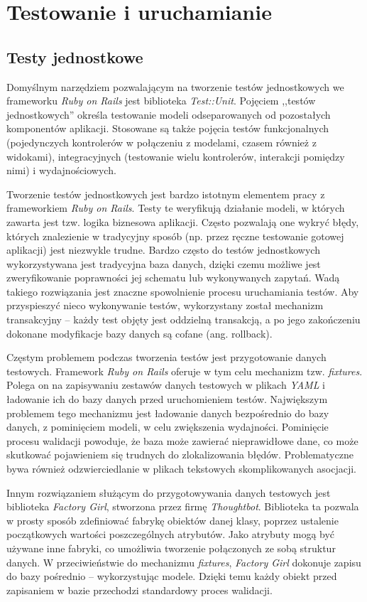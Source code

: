 \documentclass[a4paper,12pt]{article}
\begin{document}
\clearpage

\section{Testowanie i uruchamianie}

\subsection{Testy jednostkowe}
Domyślnym narzędziem pozwalającym na tworzenie testów jednostkowych we
frameworku \emph{Ruby on Rails} jest biblioteka
\emph{Test::Unit}. Pojęciem ,,testów jednostkowych'' określa
testowanie modeli odseparowanych od pozostałych komponentów
aplikacji. Stosowane są także pojęcia testów funkcjonalnych
(pojedynczych kontrolerów w połączeniu z modelami, czasem również z
widokami), integracyjnych (testowanie wielu kontrolerów, interakcji
pomiędzy nimi) i wydajnościowych.

Tworzenie testów jednostkowych jest bardzo istotnym elementem pracy z
frameworkiem \emph{Ruby on Rails}. Testy te weryfikują działanie
modeli, w których zawarta jest tzw. logika biznesowa aplikacji. Często
pozwalają one wykryć błędy, których znalezienie w tradycyjny sposób
(np. przez ręczne testowanie gotowej aplikacji) jest niezwykle
trudne. Bardzo często do testów jednostkowych wykorzystywana jest
tradycyjna baza danych, dzięki czemu możliwe jest zweryfikowanie
poprawności jej schematu lub wykonywanych zapytań. Wadą takiego
rozwiązania jest znaczne spowolnienie procesu uruchamiania testów. Aby
przyspieszyć nieco wykonywanie testów, wykorzystany został mechanizm
transakcyjny -- każdy test objęty jest oddzielną transakcją, a po jego
zakończeniu dokonane modyfikacje bazy danych są cofane
(ang. rollback).

Częstym problemem podczas tworzenia testów jest przygotowanie danych
testowych. Framework \emph{Ruby on Rails} oferuje w tym celu mechanizm
tzw. \emph{fixtures}. Polega on na zapisywaniu zestawów danych
testowych w plikach \emph{YAML} i ładowanie ich do bazy danych przed
uruchomieniem testów. Największym problemem tego mechanizmu jest
ładowanie danych bezpośrednio do bazy danych, z pominięciem modeli, w
celu zwiększenia wydajności. Pominięcie procesu walidacji powoduje, że
baza może zawierać nieprawidłowe dane, co może skutkować pojawieniem
się trudnych do zlokalizowania błędów. Problematyczne bywa również
odzwierciedlanie w plikach tekstowych skomplikowanych asocjacji.

Innym rozwiązaniem służącym do przygotowywania danych testowych jest
biblioteka \emph{Factory Girl}, stworzona przez firmę
\emph{Thoughtbot}. Biblioteka ta pozwala w prosty sposób zdefiniować
fabrykę obiektów danej klasy, poprzez ustalenie początkowych wartości
poszczególnych atrybutów. Jako atrybuty mogą być używane inne fabryki,
co umożliwia tworzenie połączonych ze sobą struktur danych. W
przeciwieństwie do mechanizmu \emph{fixtures}, \emph{Factory Girl}
dokonuje zapisu do bazy pośrednio -- wykorzystując modele. Dzięki temu
każdy obiekt przed zapisaniem w bazie przechodzi standardowy proces
walidacji.
\end{document}
